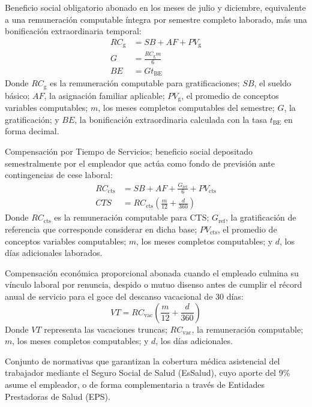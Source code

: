 Beneficio social obligatorio abonado en los meses de julio y diciembre, equivalente a una remuneración computable íntegra por semestre completo laborado, 
más una bonificación extraordinaria temporal:
\[
    \begin{aligned}
        RC_{\mathrm{g}} &= SB + AF + PV_{\mathrm{g}} \\
        G &= \frac{RC_{\mathrm{g}}m}{6} \\
        BE &= Gt_{\mathrm{BE}}
    \end{aligned}
\]
Donde \(RC_{\mathrm{g}}\) es la remuneración computable para gratificaciones; \(SB\), el sueldo básico; \(AF\), la asignación familiar aplicable; \(PV_{\mathrm{g}}\), 
el promedio de conceptos variables computables; \(m\), los meses completos computables del semestre; \(G\), la gratificación; y \(BE\), la bonificación 
extraordinaria calculada con la tasa \(t_{\mathrm{BE}}\) en forma decimal.

Compensación por Tiempo de Servicios; beneficio social depositado semestralmente por el empleador 
que actúa como fondo de previsión ante contingencias de cese laboral:
\[
\begin{aligned}
RC_{\mathrm{cts}} &=
    SB + AF + \frac{G_{\mathrm{ref}}}{6}
    + PV_{\mathrm{cts}} \\
CTS &= RC_{\mathrm{cts}}
    \left(\frac{m}{12}+\frac{d}{360}\right)
\end{aligned}
\]
Donde \(RC_{\mathrm{cts}}\) es la remuneración computable para CTS; \(G_{\mathrm{ref}}\), la gratificación de referencia 
que corresponde considerar en dicha base; \(PV_{\mathrm{cts}}\), el promedio de conceptos variables computables; \(m\), 
los meses completos computables; y \(d\), los días adicionales laborados.

Compensación económica proporcional abonada cuando el empleado culmina su vínculo laboral por renuncia, 
despido o mutuo disenso antes de cumplir el récord anual de servicio para el goce del descanso vacacional de 30 días:
\[
VT = RC_{\mathrm{vac}}
     \left(\frac{m}{12}+\frac{d}{360}\right)
\]
Donde \(VT\) representa las vacaciones truncas; \(RC_{\mathrm{vac}}\), la remuneración computable; \(m\), 
los meses completos computables; y \(d\), los días adicionales.

Conjunto de normativas que garantizan la cobertura médica asistencial del trabajador mediante el Seguro Social de Salud (EsSalud), 
cuyo aporte del 9\% asume el empleador, o de forma complementaria a través de Entidades Prestadoras de Salud (EPS).

